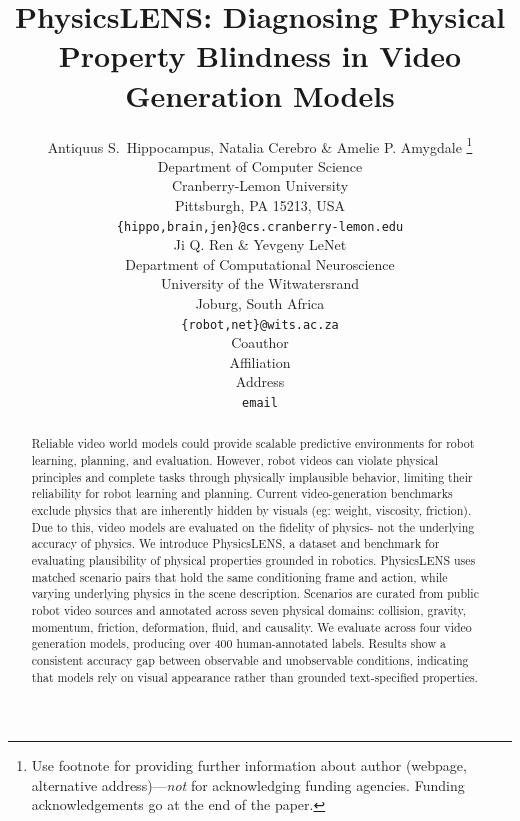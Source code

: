 \documentclass{article} %
\title{PhysicsLENS: Diagnosing Physical Property Blindness in Video Generation Models}
\author{Antiquus S.~Hippocampus, Natalia Cerebro \& Amelie P. Amygdale \thanks{ Use footnote for providing further information
about author (webpage, alternative address)---\emph{not} for acknowledging
funding agencies.  Funding acknowledgements go at the end of the paper.} \\
Department of Computer Science\\
Cranberry-Lemon University\\
Pittsburgh, PA 15213, USA \\
\texttt{\{hippo,brain,jen\}@cs.cranberry-lemon.edu} \\
\And
Ji Q. Ren \& Yevgeny LeNet \\
Department of Computational Neuroscience \\
University of the Witwatersrand \\
Joburg, South Africa \\
\texttt{\{robot,net\}@wits.ac.za} \\
\AND
Coauthor \\
Affiliation \\
Address \\
\texttt{email}
}
\begin{document}
\maketitle

\begin{abstract}


Reliable video world models could provide scalable predictive environments for robot learning, planning, and evaluation. However, robot videos can violate physical principles and complete tasks through physically implausible behavior, limiting their reliability for robot learning and planning. 
Current video-generation benchmarks exclude physics that are inherently hidden by visuals (eg: weight, viscosity, friction). Due to this, video models are evaluated on the fidelity of physics- not the underlying accuracy of physics. 
We introduce PhysicsLENS, a dataset and benchmark for evaluating plausibility of physical properties grounded in robotics. PhysicsLENS uses matched scenario pairs that hold the same conditioning frame and action, while varying underlying physics in the scene description. Scenarios are curated from public robot video sources and annotated across seven physical domains: collision, gravity, momentum, friction, deformation, fluid, and causality. We evaluate across four video generation models, producing over 400 human-annotated labels. 
Results show a consistent accuracy gap between observable and unobservable conditions, indicating that models rely on visual appearance rather than grounded text-specified properties.


\end{abstract}
\end{document}
